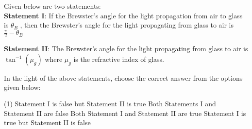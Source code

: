 \item Given below are two statements:\\
\textbf{Statement I}: If the Brewster's angle for the light propagation from air to glass is $\theta_B$ , then the Brewster's angle for the light propagating from glass to air is $\frac{\pi}{2} - \theta_B$

\textbf{Statement II}: The Brewster's angle for the light propagating from glass to air is $\tan^{-1}(\mu_g)$ where $\mu_g$ is the refractive index of glass.

In the light of the above statements, choose the correct answer from the options given below:
\begin{tasks}(1)
    \task Statement I is false but Statement II is true
    \task Both Statements I and Statement II are false
    \task Both Statement I and Statement II are true
    \task Statement I is true but Statement II is false
\end{tasks}